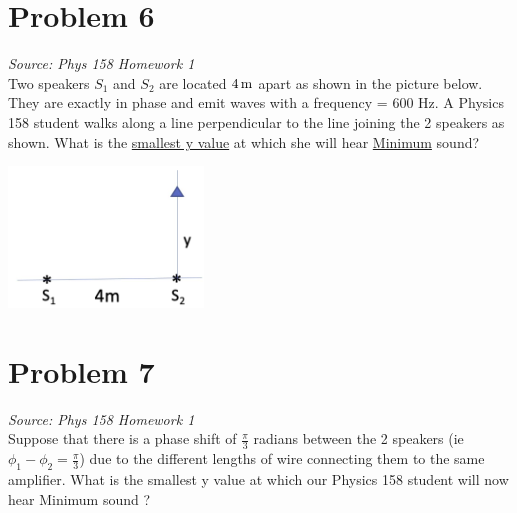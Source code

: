 \documentclass[11pt, fleqn]{article}
\begin{document}
\section*{Problem 6}
\textit{Source: Phys 158 Homework 1}\\
Two speakers $S_1$ and $S_2$ are located $4\,\mathrm{m}$ apart as shown in the picture below. They are exactly in
phase and emit waves with a frequency = 600 Hz. A Physics 158 student walks along a line perpendicular to
the line joining the 2 speakers as shown. What is the \underline{smallest y value} at which she will hear \underline{Minimum} sound?\\
\centerline{\includegraphics{Images/RightAngleInterference.png}}

\section*{Problem 7}
\textit{Source: Phys 158 Homework 1}\\
Suppose that there is a phase shift of $\frac{\pi}{3}$ radians between the 2 speakers (ie $\phi_1-\phi_2=\frac{\pi}{3}$) due to the
different lengths of wire connecting them to the same amplifier. What is the smallest y value at which our
Physics 158 student will now hear Minimum sound ?
\end{document}
